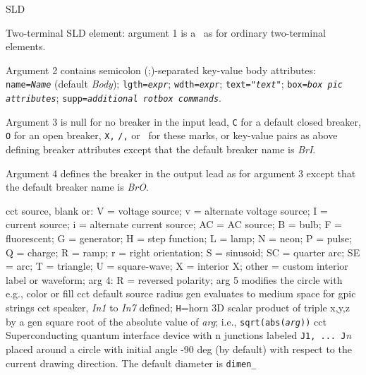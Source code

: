   {SLD}
  {Two-terminal SLD element: argument 1 is a \linespec\ as for ordinary
   two-terminal elements.

   Argument 2 contains semicolon (;)-separated key-value body attributes:
   {\tt name={\sl{}Name}} (default {\sl Body});
   {\tt lgth={\sl{}expr}};
   {\tt wdth={\sl{}expr}};
   {\tt text="{\sl{}text}"};
   {\tt box={\sl{}box pic attributes}};
   {\tt supp={\sl{}additional {\tt rotbox} commands}}.

   Argument 3 is null for no breaker in the input lead, {\tt C} for a default
   closed breaker, {\tt O} for an open breaker, {\tt X,} {\tt /,} or \bsl\ for
   these marks, or
   key-value pairs as above defining breaker attributes
   except that the default breaker name is {\sl BrI}.

   Argument 4 defines the breaker in the output lead as for argument 3
   except that the default breaker name is {\sl BrO}.
   \label{sl_ttbox}%
   }
\macrodef{source}{source}{(\linespec,
   V|v|I|i|AC|B|F|G|H|J|Q|L|N|P|S[C[r]]|E[r]]|T|X|U|{\sl other}, {\sl
   diameter},R)}
  {cct}
  {source, blank or:
                     V = voltage source; v = alternate voltage source; I =
                     current source; i = alternate current source; AC =
                     AC source; B = bulb; F = fluorescent; G = generator;
                     H = step function; L = lamp; N = neon; P = pulse;
                     Q = charge; R = ramp; r = right orientation; S =
                     sinusoid; SC = quarter arc; SE = arc; T = triangle;
                     U = square-wave; X = interior X; other = custom
                     interior label or waveform; arg 4: R = reversed
                     polarity; arg 5 modifies the circle with e.g.,
                     color or fill
   }
  {cct}
  {default source radius}
  {gen}
  {evaluates to medium space for gpic strings}
  {cct}
  {speaker, {\sl In1} to {\sl In7} defined; {\tt H}=horn
   }
  {3D} {scalar product of triple x,y,z by a}
  {gen}
  {square root of the absolute value of {\sl arg}; i.e.,
   {\tt sqrt(abs({\sl arg}))}}
  {cct}
  {Superconducting quantum interface device
   with {\sl }n junctions labeled {\tt J1, ... J}{\sl n} placed around
   a circle with initial angle -90 deg (by default) with respect to the
   current drawing direction. The default diameter is {\tt dimen\_} }
